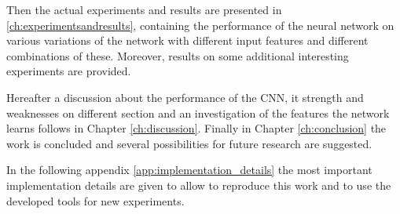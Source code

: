Then the actual experiments and results are presented in \ref{ch:experimentsandresults}, containing the performance of the neural network on various variations of the network with different input features and different combinations of these. Moreover, results on some additional interesting experiments are provided.

Hereafter a discussion about the performance of the CNN, it strength and weaknesses on different section and an investigation of the features the network learns follows in Chapter \ref{ch:discussion}. Finally in Chapter \ref{ch:conclusion} the work is concluded and several possibilities for future research are suggested. 

In the following appendix \ref{app:implementation_details} the most important implementation details are given to allow to reproduce this work and to use the developed tools for new experiments.
